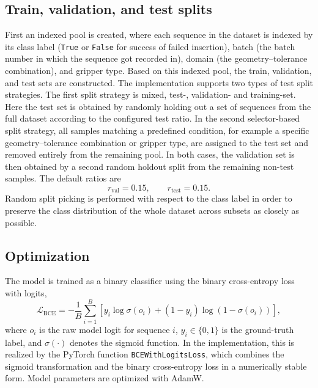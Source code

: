 \subsection{Train, validation, and test splits} \label{subsec:train_val_test_splits}
First an indexed pool is created, where each sequence in the dataset is indexed by its class label (\texttt{True} or \texttt{False} for success of failed insertion), batch (the batch number in which the sequence got recorded in), domain (the geometry--tolerance combination), and gripper type. Based on this indexed pool, the train, validation, and test sets are constructed. The implementation supports two types of test split strategies. The first split strategy is mixed, test-, validation- and training-set. Here the test set is obtained by randomly holding out a set of sequences from the full dataset according to the configured test ratio. In the second selector-based split strategy, all samples matching a predefined condition, for example a specific geometry--tolerance combination or gripper type, are assigned to the test set and removed entirely from the remaining pool. In both cases, the validation set is then obtained by a second random holdout split from the remaining non-test samples. The default ratios are
\begin{equation}
r_{\mathrm{val}} = 0.15,
\qquad
r_{\mathrm{test}} = 0.15.
\end{equation}
Random split picking is performed with respect to the class label in order to preserve the class distribution of the whole dataset across subsets as closely as possible.

\subsection{Optimization}
The model is trained as a binary classifier using the binary cross-entropy loss with logits,
\begin{equation}
\mathcal{L}_{\mathrm{BCE}} =
-\frac{1}{B}\sum_{i=1}^{B}
\left[
y_i \log \sigma(o_i)
+
(1-y_i)\log\left(1-\sigma(o_i)\right)
\right],
\end{equation}
where $o_i$ is the raw model logit for sequence $i$, $y_i \in \{0,1\}$ is the ground-truth label, and $\sigma(\cdot)$ denotes the sigmoid function. In the implementation, this is realized by the PyTorch function \texttt{BCEWithLogitsLoss}, which combines the sigmoid transformation and the binary cross-entropy loss in a numerically stable form\cite{BCEWithLogitsLossPyTorch211}. Model parameters are optimized with AdamW.

